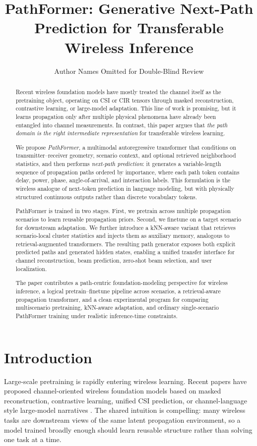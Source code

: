 \documentclass[11pt]{article}
\title{\textbf{PathFormer: Generative Next-Path Prediction for Transferable Wireless Inference}}
\author{Author Names Omitted for Double-Blind Review}
\date{}
\begin{document}
\maketitle

\begin{abstract}
Recent wireless foundation models have mostly treated the channel itself as the pretraining object, operating on CSI or CIR tensors through masked reconstruction, contrastive learning, or large-model adaptation. This line of work is promising, but it learns propagation only after multiple physical phenomena have already been entangled into channel measurements. In contrast, this paper argues that \emph{the path domain is the right intermediate representation} for transferable wireless learning.

We propose \emph{PathFormer}, a multimodal autoregressive transformer that conditions on transmitter--receiver geometry, scenario context, and optional retrieved neighborhood statistics, and then performs \emph{next-path prediction}: it generates a variable-length sequence of propagation paths ordered by importance, where each path token contains delay, power, phase, angle-of-arrival, and interaction labels. This formulation is the wireless analogue of next-token prediction in language modeling, but with physically structured continuous outputs rather than discrete vocabulary tokens.

PathFormer is trained in two stages. First, we pretrain across multiple propagation scenarios to learn reusable propagation priors. Second, we finetune on a target scenario for downstream adaptation. We further introduce a kNN-aware variant that retrieves scenario-local cluster statistics and injects them as auxiliary memory, analogous to retrieval-augmented transformers. The resulting path generator exposes both explicit predicted paths and generated hidden states, enabling a unified transfer interface for channel reconstruction, beam prediction, zero-shot beam selection, and user localization.

The paper contributes a path-centric foundation-modeling perspective for wireless inference, a logical pretrain--finetune pipeline across scenarios, a retrieval-aware propagation transformer, and a clean experimental program for comparing multiscenario pretraining, kNN-aware adaptation, and ordinary single-scenario PathFormer training under realistic inference-time constraints.
\end{abstract}

\section{Introduction}
Large-scale pretraining is rapidly entering wireless learning. Recent papers have proposed channel-oriented wireless foundation models based on masked reconstruction, contrastive learning, unified CSI prediction, or channel-language style large-model narratives \cite{lwm,wifo,csiclip,channelgpt,contrawimae}. The shared intuition is compelling: many wireless tasks are downstream views of the same latent propagation environment, so a model trained broadly enough should learn reusable structure rather than solving one task at a time.
\end{document}
